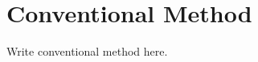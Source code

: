 \documentclass[a4paper,11pt,oneside,openany,fleqn]{jsbook}
\begin{document}
    \chapter{Conventional Method}
        Write conventional method here.
\end{document}
